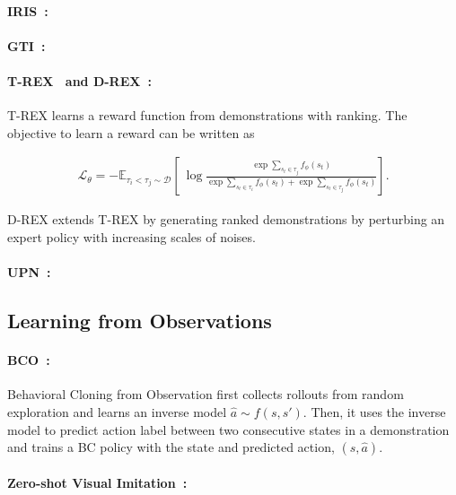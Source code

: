 \paragraph{IRIS~\citep{mandlekar2019iris}:}


\paragraph{GTI~\citep{mandlekar2020learning}:}


\paragraph{T-REX~\citep{brown2019extrapolating} and D-REX~\citep{brown2019better}:}
T-REX learns a reward function from demonstrations with ranking. The objective to learn a reward can be written as

\begin{align}
  \label{eq:ranking_loss}
  \mathcal{L}_{\theta} = -\mathbb{E}_{\tau_i < \tau_j \sim \mathcal{D}} \left[
    \
    \log \frac{\exp \sum_{s_t \in \tau_j}{f_{\phi}(s_{t})}}{\exp \sum_{s_t \in \tau_i}{f_{\phi}(s_{t})} + \exp \sum_{s_t \in \tau_j}{f_{\phi}(s_{t})} }
  \right].
\end{align}

D-REX extends T-REX by generating ranked demonstrations by perturbing an expert policy with increasing scales of noises.

\paragraph{UPN~\citep{srinivas2018universal}:}

\subsection{Learning from Observations}

\paragraph{BCO~\citep{torabi2018behavioral}:}
Behavioral Cloning from Observation first collects rollouts from random exploration and learns an inverse model $\hat{a} \sim f(s, s')$. Then, it uses the inverse model to predict action label between two consecutive states in a demonstration and trains a BC policy with the state and predicted action, $(s, \hat{a})$.

\paragraph{Zero-shot Visual Imitation~\citep{pathak*2018zeroshot}:}


